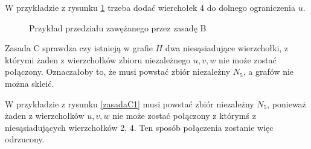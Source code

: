 W przykładzie z rysunku \ref{zasadaB2} trzeba dodać wierchołek 4 do dolnego ograniczenia $u$.
\begin{figure}[H]
  \centering
 \caption{Przykład przedziału zawężanego przez zasadę B}
 \label{zasadaB2}
 \end{figure}

Zasada C sprawdza czy istnieją w grafie $H$ dwa niesąsiadujące wierzchołki, z którymi żaden z wierzchołków zbioru niezależnego $u, v, w$ nie może zostać połączony. 
Oznaczałoby to, że musi powstać zbiór niezależny $N_5$, a grafów nie można skleić.

W przykładzie z rysunku \ref{zasadaC1} musi powstać zbiór niezależny $N_5$, ponieważ żaden z wierzchołków $u, v, w$ nie może zostać połączony z którymś z niesąsiadujących 
wierzchołków 2, 4. Ten sposób połączenia zostanie więc odrzucony. 

